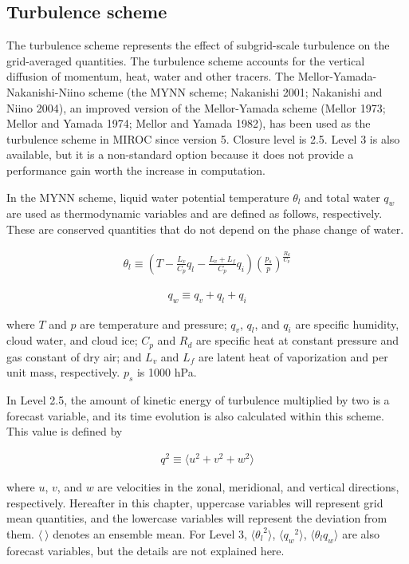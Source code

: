 \hypertarget{turbulence-scheme}{%
\subsection{Turbulence scheme}\label{turbulence-scheme}}

The turbulence scheme represents the effect of subgrid-scale turbulence
on the grid-averaged quantities. The turbulence scheme accounts for the
vertical diffusion of momentum, heat, water and other tracers. The
Mellor-Yamada-Nakanishi-Niino scheme (the MYNN scheme; Nakanishi 2001;
Nakanishi and Niino 2004), an improved version of the Mellor-Yamada
scheme (Mellor 1973; Mellor and Yamada 1974; Mellor and Yamada 1982),
has been used as the turbulence scheme in MIROC since version 5. Closure
level is 2.5. Level 3 is also available, but it is a non-standard option
because it does not provide a performance gain worth the increase in
computation.

In the MYNN scheme, liquid water potential temperature \(\theta_l\) and
total water \(q_w\) are used as thermodynamic variables and are defined
as follows, respectively. These are conserved quantities that do not
depend on the phase change of water.

\begin{eqnarray} \theta_l \equiv \left(T - \frac{L_v}{C_p}q_l - \frac{L_v+L_f}{C_p}q_i \right) \left(\frac{p_s}{p}\right)^{\frac{R_d}{C_p}} \end{eqnarray}

\begin{eqnarray} q_w \equiv q_v+q_l+q_i \end{eqnarray}

where \(T\) and \(p\) are temperature and pressure; \(q_v\), \(q_l\),
and \(q_i\) are specific humidity, cloud water, and cloud ice; \(C_p\)
and \(R_d\) are specific heat at constant pressure and gas constant of
dry air; and \(L_v\) and \(L_f\) are latent heat of vaporization and per
unit mass, respectively. \(p_s\) is 1000 hPa.

In Level 2.5, the amount of kinetic energy of turbulence multiplied by
two is a forecast variable, and its time evolution is also calculated
within this scheme. This value is defined by

\begin{eqnarray}q^2 \equiv \langle u^2 + v^2 + w^2 \rangle\end{eqnarray}

where \(u\), \(v\), and \(w\) are velocities in the zonal, meridional,
and vertical directions, respectively. Hereafter in this chapter,
uppercase variables will represent grid mean quantities, and the
lowercase variables will represent the deviation from them.
\(\langle \ \rangle\) denotes an ensemble mean. For Level 3,
\(\langle {\theta_l}^2 \rangle\), \(\langle {q_w}^2 \rangle\),
\(\langle \theta_l q_w \rangle\) are also forecast variables, but the
details are not explained here.

